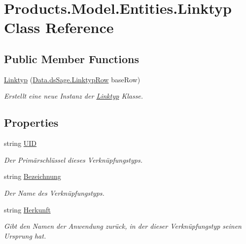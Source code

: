 \hypertarget{class_products_1_1_model_1_1_entities_1_1_linktyp}{}\section{Products.\+Model.\+Entities.\+Linktyp Class Reference}
\label{class_products_1_1_model_1_1_entities_1_1_linktyp}
\subsection*{Public Member Functions}
\begin{DoxyCompactItemize}
\item 
\hyperlink{class_products_1_1_model_1_1_entities_1_1_linktyp_a0e3112f857aecd7b2ce9f58fceadf5ff}{Linktyp} (\hyperlink{class_products_1_1_data_1_1ds_sage_1_1_linktyp_row}{Data.\+ds\+Sage.\+Linktyp\+Row} base\+Row)
\begin{DoxyCompactList}\small\item\em Erstellt eine neue Instanz der \hyperlink{class_products_1_1_model_1_1_entities_1_1_linktyp}{Linktyp} Klasse. \end{DoxyCompactList}\end{DoxyCompactItemize}
\subsection*{Properties}
\begin{DoxyCompactItemize}
\item 
string \hyperlink{class_products_1_1_model_1_1_entities_1_1_linktyp_a1971a853a3070ef030f12e50b4f2dda0}{U\+ID}
\begin{DoxyCompactList}\small\item\em Der Primärschlüssel dieses Verknüpfungstyps. \end{DoxyCompactList}\item 
string \hyperlink{class_products_1_1_model_1_1_entities_1_1_linktyp_adf58cfefce27a0024eabaa3a9bcf98cd}{Bezeichnung}
\begin{DoxyCompactList}\small\item\em Der Name des Verknüpfungstyps. \end{DoxyCompactList}\item 
string \hyperlink{class_products_1_1_model_1_1_entities_1_1_linktyp_a78c0808d53de5b36251533bbe0ddb1fe}{Herkunft}
\begin{DoxyCompactList}\small\item\em Gibt den Namen der Anwendung zurück, in der dieser Verknüpfungstyp seinen Ursprung hat. \end{DoxyCompactList}\end{DoxyCompactItemize}


